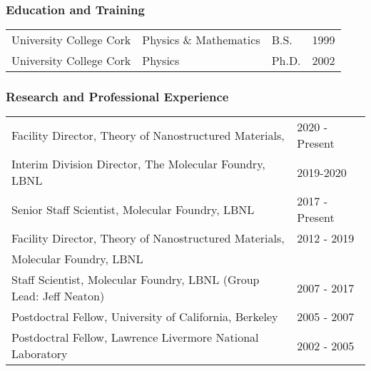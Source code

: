 \subsubsection*{Education and Training}

\begin{table}[ht]
    \centering
    \begin{tabular}{llll}
        University College Cork & Physics \& Mathematics & B.S. & 1999 \\
        University College Cork & Physics & Ph.D. & 2002 \\
    \end{tabular}
\end{table}

\subsubsection*{Research and Professional Experience}

\begin{table}[ht]
    \centering
    \begin{tabular}{ll}
        Facility Director, Theory of Nanostructured Materials, & 2020 - Present \\
        Interim Division Director, The Molecular Foundry, LBNL & 2019-2020 \\ 
    Senior Staff Scientist, Molecular Foundry, LBNL & 2017 - Present    \\
        Facility Director, Theory of Nanostructured Materials, & 2012 - 2019 \\
        Molecular Foundry, LBNL & \\
        Staff Scientist, Molecular Foundry, LBNL (Group Lead: Jeff Neaton) & 2007 - 2017 \\
        Postdoctral Fellow, University of California, Berkeley & 2005 - 2007 \\
        Postdoctral Fellow, Lawrence Livermore National Laboratory & 2002 - 2005 \\
    \end{tabular}
\end{table}

